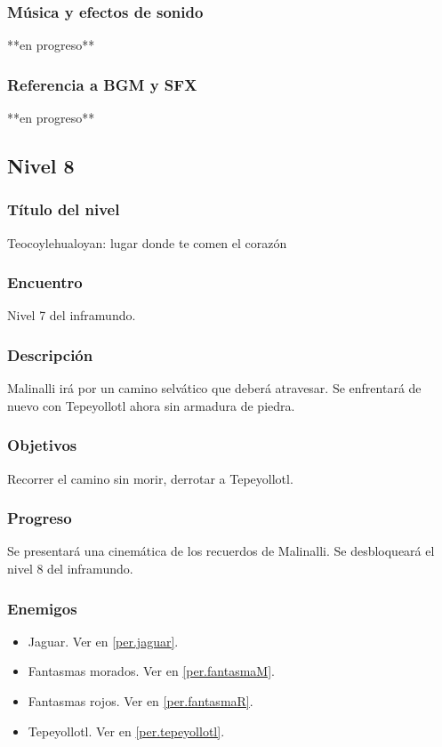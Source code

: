 \documentclass[11pt,letterpaper]{article}
\begin{document}
	\subsubsection{Música y efectos de sonido}
	**en progreso**
	\subsubsection{Referencia a BGM y SFX}
	**en progreso**
	
	
		\subsection{Nivel 8}
	\subsubsection{Título del nivel}
	Teocoylehualoyan: lugar donde te comen el corazón
	\subsubsection{Encuentro}
	Nivel 7 del inframundo.
	\subsubsection{Descripción}
	Malinalli irá por un camino selvático que deberá atravesar. Se enfrentará de nuevo con Tepeyollotl ahora sin armadura de piedra.
	\subsubsection{Objetivos}
	Recorrer el camino sin morir, derrotar a Tepeyollotl.
	\subsubsection{Progreso}
	Se presentará una cinemática de los recuerdos de Malinalli. Se desbloqueará el nivel 8 del inframundo.
	\subsubsection{Enemigos}
	\begin{itemize}
		\item Jaguar. Ver en \ref{per.jaguar}.
		\item Fantasmas morados. Ver en \ref{per.fantasmaM}.
		\item Fantasmas rojos. Ver en \ref{per.fantasmaR}.
		\item Tepeyollotl. Ver en \ref{per.tepeyollotl}.
	\end{itemize}
\end{document}
